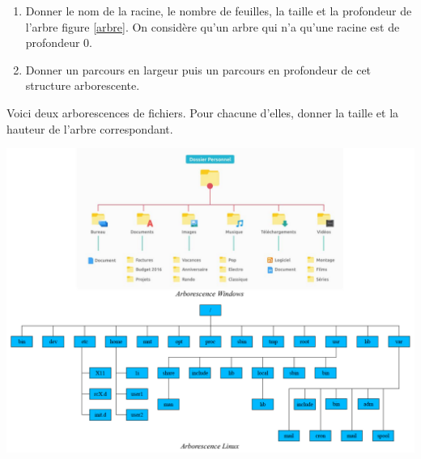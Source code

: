 \documentclass[a4paper,11pt]{article}
\begin{document}
\begin{Form}
\begin{exo}
\begin{center}
\label{arbre}
\end{center}
\begin{enumerate}
\item Donner le nom de la racine, le nombre de feuilles, la taille et la profondeur de l'arbre figure \ref{arbre}. On considère qu'un arbre qui n'a qu'une racine est de profondeur 0.
\item Donner un parcours en largeur puis un parcours en profondeur de cet structure arborescente.
\end{enumerate}
\end{exo}
\begin{exo}
Voici deux arborescences de fichiers. Pour chacune d’elles, donner la taille et la hauteur de l’arbre correspondant.
\begin{center}
\centering
\includegraphics[width=14cm]{ressources/os.png}
\label{os}
\end{center}



\end{exo}
\end{Form}
\end{document}
